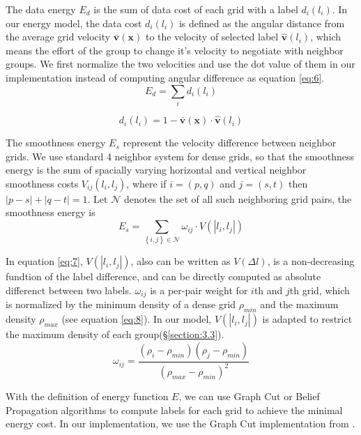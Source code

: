 The data energy $E_d$ is the sum of data cost of each grid with a label $d_i(l_i)$. In our energy model, the data cost $d_i(l_i)$ is defined as the angular distance from the average grid velocity $\bar{\textbf{v}}(\textbf{x})$ to the velocity of selected label $\hat{\textbf{v}}(l_i)$, which means the effort of the group to change it's velocity to negotiate with neighbor groups. We first normalize the two velocities and use the dot value of them in our implementation instead of computing angular difference as equation \ref{eq:6}.
\begin{equation}
\label{eq:5}
E_d = \sum_{i}d_i(l_i)
\end{equation}

\begin{equation}
\label{eq:6}
d_i(l_i) = 1 - \bar{\textbf{v}}(\textbf{x}) \cdot \hat{\textbf{v}}(l_i)
\end{equation}

The smoothness energy $E_s$ represent the velocity difference between neighbor grids. We use standard 4 neighbor system for dense grids, so that the smoothness energy is the sum of spacially varying horizontal and vertical neighbor smoothness costs $V_{ij}(l_i,l_j)$, where if $i=(p,q)$ and $j=(s,t)$ then $\left|p-s\right| + \left|q-t\right| = 1$. Let $\mathcal{N}$ denotes the set of all such neighboring grid pairs, the smoothness energy is
\begin{equation}
\label{eq:7}
E_s = \sum\limits_{\left\{ {i,j} \right\} \in \mathcal{N}} \omega_{ij} \cdot V(\left|l_i,l_j\right|)
\end{equation}

In equation \ref{eq:7}, $V(\left|l_i,l_j\right|)$, also can be written as $V(\Delta l)$, is a non-decreasing fundtion of the label difference, and can be directly computed as absolute differenct between two labels. $\omega_{ij}$ is a per-pair weight for $i$th and $j$th grid, which is normalized by the minimum density of a dense grid $\rho_{min}$ and the maximum density $\rho_{max}$ (see equation \ref{eq:8}). In our model, $V(\left|l_i,l_j\right|)$ is adapted to restrict the maximum density of each group(\S\ref{section:3.3}).
\begin{equation}
\label{eq:8}
\omega_{ij} = \frac{(\rho_i - \rho_{min})(\rho_j - \rho_{min})}{(\rho_{max} - \rho_{min})^2}
\end{equation}

With the definition of energy function $E$, we can use Graph Cut or Belief Propagation algorithms to compute labels for each grid to achieve the minimal energy cost. In our implementation, we use the Graph Cut implementation from \cite{Boykov:2001,Boykov:2004,Kolmogorov:2004}.

